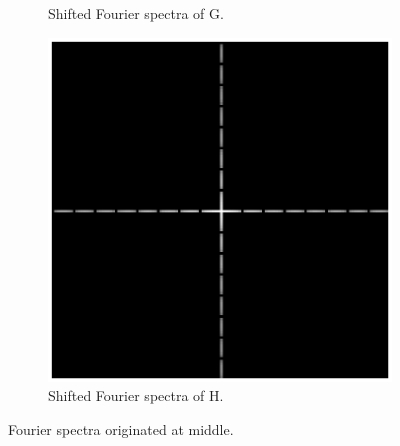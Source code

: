 \documentclass[11pt,a4paper]{article}
\begin{document}
\begin{figure}[!ht]
\begin{subfigure}[t]{.32\linewidth}
		\caption{Shifted Fourier spectra of G.}
		\label{fig:Ghat_Shift_Abs_Log}
	\end{subfigure}
	\begin{subfigure}[t]{.32\linewidth} %
		\includegraphics[width=\columnwidth]{Linearity_Hhat_Shift_Abs_Log.eps}
		\caption{Shifted Fourier spectra of H.}
		\label{fig:Hhat_Shift_Abs_Log}
	\end{subfigure}
	\caption{Fourier spectra originated at middle.}
	\label{fig:shiftedSpactrum}
\end{figure}
\end{document}
